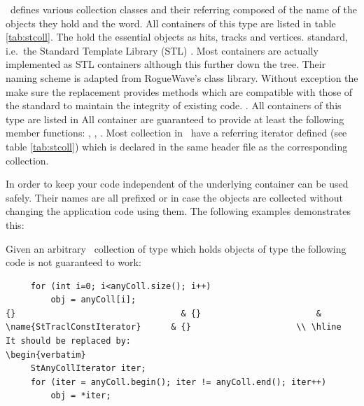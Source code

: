 \begin{enumerate}
\begin{center}
{\StEvent\ defines various collection classes and their referring
    composed of the name of the objects they hold and the word.  All
    containers of this type are listed in table \ref{tab:stcoll}.
    The hold the essential objects as hits, tracks and vertices.
standard, i.e.~the Standard Template Library (STL) . Most
containers are actually implemented as STL containers although this
    further down the tree.  Their naming scheme is adapted from
    RogueWave's  class library. Without exception the
make sure the replacement provides methods which are compatible with those
of the standard to maintain the integrity of existing code.
    .  All containers of this type are listed in
All container are guaranteed to provide at least the following member functions:
, , .  Most collection in
\StEvent\ have a referring iterator defined (see table \ref{tab:stcoll})
which is declared in the same header file as the
corresponding collection.
    
In order to keep your code independent of the underlying container
     can be used safely. Their names are all prefixed
     or  in case the objects are collected
without changing the application code using them. The following
examples demonstrates this:

Given an arbitrary \StEvent\ collection  of type 
which holds objects of type
 the following code is not guaranteed to work:
\begin{verbatim}
     for (int i=0; i<anyColl.size(); i++)
         obj = anyColl[i];
{}                                 & {}                       & \name{StTraclConstIterator}      & {}                     \\ \hline
It should be replaced by:
\begin{verbatim}
     StAnyCollIterator iter;
     for (iter = anyColl.begin(); iter != anyColl.end(); iter++)
         obj = *iter;
\end{verbatim}

}
\end{center}
\end{enumerate}
